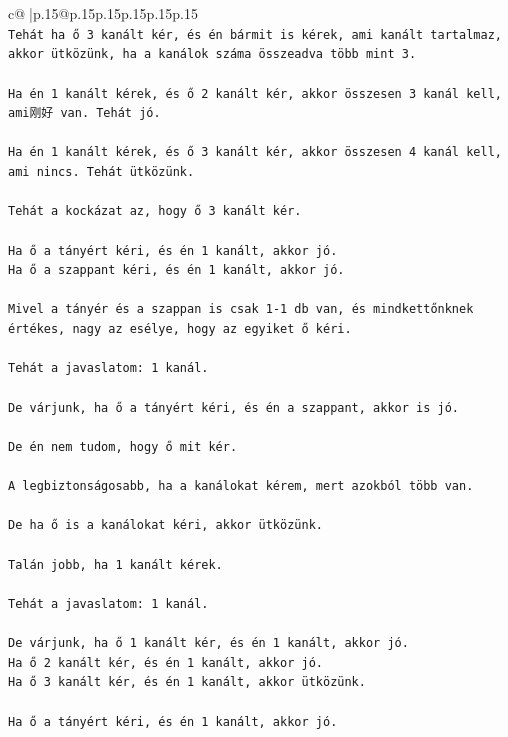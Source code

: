 \documentclass{article}
\begin{document}
{\begin{supertabular}{c@{$\;$}|p{.15\linewidth}@{}p{.15\linewidth}p{.15\linewidth}p{.15\linewidth}p{.15\linewidth}p{.15\linewidth}}
{{{\\ 
\texttt{Tehát ha ő 3 kanált kér, és én bármit is kérek, ami kanált tartalmaz, akkor ütközünk, ha a kanálok száma összeadva több mint 3.} \\
\\ 
\texttt{Ha én 1 kanált kérek, és ő 2 kanált kér, akkor összesen 3 kanál kell, ami刚好 van. Tehát jó.} \\
\\ 
\texttt{Ha én 1 kanált kérek, és ő 3 kanált kér, akkor összesen 4 kanál kell, ami nincs. Tehát ütközünk.} \\
\\ 
\texttt{Tehát a kockázat az, hogy ő 3 kanált kér.} \\
\\ 
\texttt{Ha ő a tányért kéri, és én 1 kanált, akkor jó.} \\
\texttt{Ha ő a szappant kéri, és én 1 kanált, akkor jó.} \\
\\ 
\texttt{Mivel a tányér és a szappan is csak 1{-}1 db van, és mindkettőnknek értékes, nagy az esélye, hogy az egyiket ő kéri.} \\
\\ 
\texttt{Tehát a javaslatom: 1 kanál.} \\
\\ 
\texttt{De várjunk, ha ő a tányért kéri, és én a szappant, akkor is jó.} \\
\\ 
\texttt{De én nem tudom, hogy ő mit kér.} \\
\\ 
\texttt{A legbiztonságosabb, ha a kanálokat kérem, mert azokból több van.} \\
\\ 
\texttt{De ha ő is a kanálokat kéri, akkor ütközünk.} \\
\\ 
\texttt{Talán jobb, ha 1 kanált kérek.} \\
\\ 
\texttt{Tehát a javaslatom: 1 kanál.} \\
\\ 
\texttt{De várjunk, ha ő 1 kanált kér, és én 1 kanált, akkor jó.} \\
\texttt{Ha ő 2 kanált kér, és én 1 kanált, akkor jó.} \\
\texttt{Ha ő 3 kanált kér, és én 1 kanált, akkor ütközünk.} \\
\\ 
\texttt{Ha ő a tányért kéri, és én 1 kanált, akkor jó.} \\
}}}
\end{supertabular}}
\end{document}
